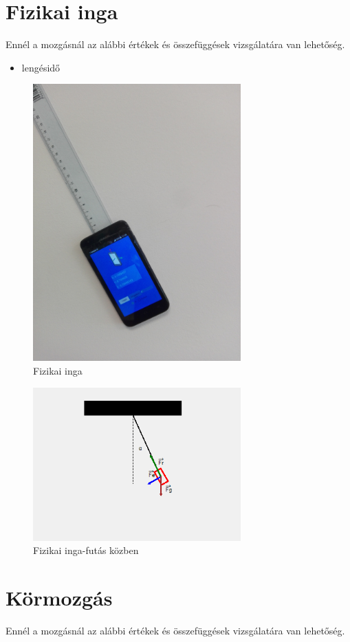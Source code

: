 \documentclass{thesis-ekf}
\theoremstyle{definition}
\theoremstyle{remark}
\begin{document}
\section{Fizikai inga}
Ennél a mozgásnál az alábbi értékek és összefüggések vizsgálatára van lehetőség.

\begin{itemize}
	\item lengésidő
\end{itemize}

	\begin{figure}[!h]
		\centering
		\includegraphics[width=8cm]{fizikai_inga}
		\caption{Fizikai inga}\label{inga1}
	\end{figure}
	\begin{figure}[!h]
		\centering
		\includegraphics[width=8cm]{ingamodell}
		\caption{Fizikai inga-futás közben}\label{inga2}
	\end{figure}
	
\pagebreak
\section{Körmozgás}
Ennél a mozgásnál az alábbi értékek és összefüggések vizsgálatára van lehetőség.
\end{document}
